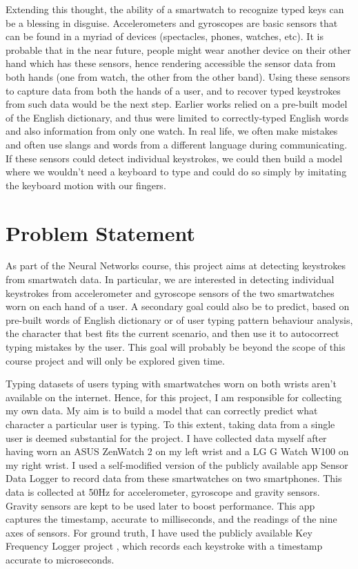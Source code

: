 \documentclass[10pt,twocolumn,letterpaper]{article}
\begin{document}
Extending this thought, the ability of a smartwatch to recognize typed keys can be a blessing in disguise. Accelerometers and gyroscopes are basic sensors that can be found in a myriad of devices (spectacles, phones, watches, etc). It is probable that in the near future, people might wear another device on their other hand which has these sensors, hence rendering accessible the sensor data from both hands (one from watch, the other from the other band). Using these sensors to capture data from both the hands of a user, and to recover typed keystrokes from such data would be the next step. Earlier works \cite{wang} \cite{maiti} relied on a pre-built model of the English dictionary, and thus were limited to correctly-typed English words and also information from only one watch. In real life, we often make mistakes and often use slangs and words from a different language during communicating. If these sensors could detect individual keystrokes, we could then build a model where we wouldn't need a keyboard to type and could do so simply by imitating the keyboard motion with our fingers.

\section{Problem Statement}
As part of the Neural Networks course, this project aims at detecting keystrokes from smartwatch data. In particular, we are interested in detecting individual keystrokes from accelerometer and gyroscope sensors of the two smartwatches worn on each hand of a user. A secondary goal could also be to predict, based on pre-built words of English dictionary or of user typing pattern behaviour analysis, the character that best fits the current scenario, and then use it to autocorrect typing mistakes by the user. This goal will probably be beyond the scope of this course project and will only be explored given time.

Typing datasets of users typing with smartwatches worn on both wrists aren't available on the internet. Hence, for this project, I am responsible for collecting my own data. My aim is to build a model that can correctly predict what character a particular user is typing. To this extent, taking data from a single user is deemed substantial for the project. I have collected data myself after having worn an ASUS ZenWatch 2 on my left wrist and a LG G Watch W100 on my right wrist. I used a self-modified version of the publicly available app Sensor Data Logger \cite{app} to record data from these smartwatches on two smartphones. This data is collected at 50Hz for accelerometer, gyroscope and gravity sensors. Gravity sensors are kept to be used later to boost performance. This app captures the timestamp, accurate to milliseconds, and the readings of the nine axes of sensors. For ground truth, I have used the publicly available Key Frequency Logger project \cite{keyfreq}, which records each keystroke with a timestamp accurate to microseconds.
\end{document}
